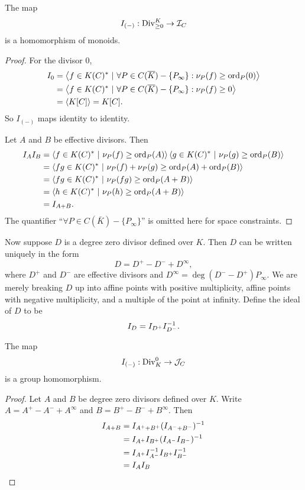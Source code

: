 \begin{proposition}
  The map
  \[ I_{(-)} : \operatorname{Div}_{\geq 0}^K \to \mathcal{I}_C \]
  is a homomorphism of monoids.
\end{proposition}
\begin{proof}
  For the divisor $0$,
  \begin{align*}
    I_0 &= \left\langle  f \in K(C)^* ~|~ \forall P \in C(\overline K) - \{P_\infty\} : \nu_P(f) \geq \operatorname{ord}_P(0)  \right\rangle \\
        &= \left\langle  f \in K(C)^* ~|~ \forall P \in C(\overline K) - \{P_\infty\} : \nu_P(f) \geq 0  \right\rangle \\
        &= \left\langle  K[C]  \right\rangle = K[C].
  \end{align*}
  So $I_{(-)}$ maps identity to identity.
  
  Let $A$ and $B$ be effective divisors. Then
  \begin{align*}
    I_AI_B &= \left\langle  f \in K(C)^* ~|~ \nu_P(f) \geq \operatorname{ord}_P(A)  \right\rangle \left\langle  g \in K(C)^* ~|~ \nu_P(g) \geq \operatorname{ord}_P(B)  \right\rangle \\
           &= \left\langle  fg \in K(C)^* ~|~ \nu_P(f) + \nu_P(g) \geq \operatorname{ord}_P(A) + \operatorname{ord}_P(B)  \right\rangle \\
           &= \left\langle  fg \in K(C)^* ~|~ \nu_P(fg) \geq \operatorname{ord}_P(A + B) \right\rangle \\
           &= \left\langle  h \in K(C)^* ~|~ \nu_P(h) \geq \operatorname{ord}_P(A + B) \right\rangle \\
           &= I_{A+B}.
  \end{align*}
  The quantifier ``$\forall P \in C(\bar K) - \{P_\infty\}$'' is omitted here for space constraints.
\end{proof}

Now suppose $D$ is a degree zero divisor defined over $K$.
Then $D$ can be written uniquely in the form
  \[ D = D^+ - D^- + D^\infty, \]
where $D^+$ and $D^-$ are effective divisors and $D^\infty = \deg(D^- - D^+)P_\infty$.
We are merely breaking $D$ up into affine points with positive multiplicity,
affine points with negative multiplicity, and a multiple of the point at infinity.
Define the ideal of $D$ to be
\[ I_D = I_{D^+}I_{D^-}^{-1}. \]
\begin{theorem}
  The map 
    \[ I_{(-)} : \operatorname{Div}_K^0 \to \mathcal{J}_C \]
  is a group homomorphism.
\end{theorem}
\begin{proof}
  Let $A$ and $B$ be degree zero divisors defined over $K$.
  Write $A = A^+ - A^- + A^\infty$ and $B = B^+ - B^- + B^\infty$.
  Then
  \begin{align*}
    I_{A + B}
      &= I_{A^+ + B^+}(I_{A^- + B^-})^{-1} \\
      &= I_{A^+}I_{B^+}(I_{A^-}I_{B^-})^{-1} \\
      &= I_{A^+} I_{A^-}^{-1} I_{B^+} I_{B^-}^{-1} \\
      &= I_A I_B \\
  \end{align*}
\end{proof}



